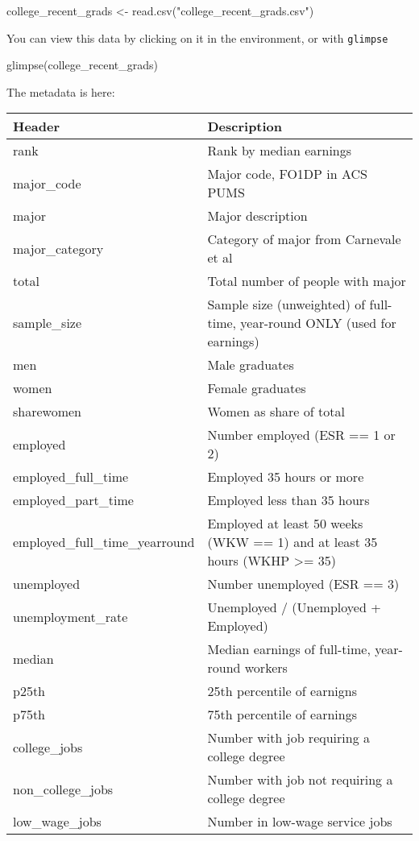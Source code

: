 \documentclass[
]{article}
\newenvironment{Shaded}{\begin{snugshade}}{\end{snugshade}}
\newcommand{\FunctionTok}[1]{\textcolor[rgb]{0.00,0.00,0.00}{#1}}
\newcommand{\NormalTok}[1]{#1}
\newcommand{\OtherTok}[1]{\textcolor[rgb]{0.56,0.35,0.01}{#1}}
\newcommand{\StringTok}[1]{\textcolor[rgb]{0.31,0.60,0.02}{#1}}
\begin{document}
\begin{Shaded}
\begin{Highlighting}[]
\NormalTok{college\_recent\_grads }\OtherTok{\textless{}{-}} \FunctionTok{read.csv}\NormalTok{(}\StringTok{"college\_recent\_grads.csv"}\NormalTok{)}
\end{Highlighting}
\end{Shaded}

You can view this data by clicking on it in the environment, or with
\texttt{glimpse}

\begin{Shaded}
\begin{Highlighting}[]
\FunctionTok{glimpse}\NormalTok{(college\_recent\_grads)}
\end{Highlighting}
\end{Shaded}

The metadata is here:

\begin{longtable}[]{@{}
  >{\raggedright\arraybackslash}p{}
  >{\raggedright\arraybackslash}p{}@{}}
\toprule
Header & Description \\
\midrule
\endhead
rank & Rank by median earnings \\
major\_code & Major code, FO1DP in ACS PUMS \\
major & Major description \\
major\_category & Category of major from Carnevale et al \\
total & Total number of people with major \\
sample\_size & Sample size (unweighted) of full-time, year-round ONLY
(used for earnings) \\
men & Male graduates \\
women & Female graduates \\
sharewomen & Women as share of total \\
employed & Number employed (ESR == 1 or 2) \\
employed\_full\_time & Employed 35 hours or more \\
employed\_part\_time & Employed less than 35 hours \\
employed\_full\_time\_yearround & Employed at least 50 weeks (WKW == 1)
and at least 35 hours (WKHP \textgreater= 35) \\
unemployed & Number unemployed (ESR == 3) \\
unemployment\_rate & Unemployed / (Unemployed + Employed) \\
median & Median earnings of full-time, year-round workers \\
p25th & 25th percentile of earnigns \\
p75th & 75th percentile of earnings \\
college\_jobs & Number with job requiring a college degree \\
non\_college\_jobs & Number with job not requiring a college degree \\
low\_wage\_jobs & Number in low-wage service jobs \\
\bottomrule
\end{longtable}
\end{document}
